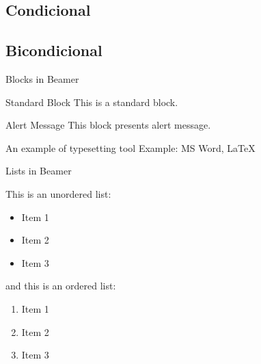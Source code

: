 \documentclass[10pt, headsepline, captions=tableabove,xcolor=table]{beamer}
\begin{document}
\subsection{Condicional}
%
\subsection{Bicondicional}
%

\begin{frame}{Blocks in Beamer}
    \begin{block}{Standard Block}
        This is a standard block.
    \end{block}
    \begin{alertblock}{Alert Message}
        This block presents alert message.
    \end{alertblock}
    \begin{exampleblock}{An example of typesetting tool}
        Example: MS Word, \LaTeX{}
    \end{exampleblock}
\end{frame}
%
\begin{frame}{Lists in Beamer}

    This is an unordered list:
    \begin{itemize}
        \item Item 1
        \item Item 2
        \item Item 3
    \end{itemize}
    
    and this is an ordered list:
    \begin{enumerate}
        \item Item 1
        \item Item 2
        \item Item 3
    \end{enumerate}
    
    \end{frame}
\end{document}
